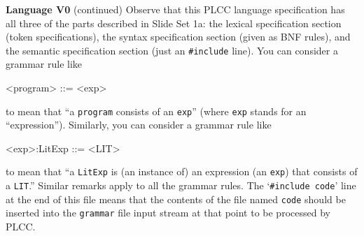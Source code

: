 \begin{minipage}[t]{\sw}
\slidenumber
\LARGE
{\bf Language V0} (continued)\exx
Observe that this PLCC language specification has all three
of the parts described in Slide Set 1a:
the lexical specification section (token specifications), 
the syntax specification section (given as BNF rules),
and the semantic specification section (just an \verb'#include' line).\exx
You can consider a grammar rule like
{\Large
\begin{qv}
<program>        ::= <exp>
\end{qv}
}
to mean that ``a \verb'program' consists of an \verb'exp'''
(where \verb'exp' stands for an ``expression'').
Similarly, you can consider a grammar rule like
{\Large
\begin{qv}
<exp>:LitExp     ::= <LIT>
\end{qv}
}
to mean that ``a \verb'LitExp' is (an instance of) an expression (an \verb'exp')
that consists of a \verb'LIT'.''
Similar remarks apply to all the grammar rules.\exx
The `\verb'#include code'' line at the end of this file
means that the contents of the file named \verb'code'
should be inserted into the \verb'grammar' file input stream
at that point to be processed by PLCC.
\end{minipage}
\clearpage
